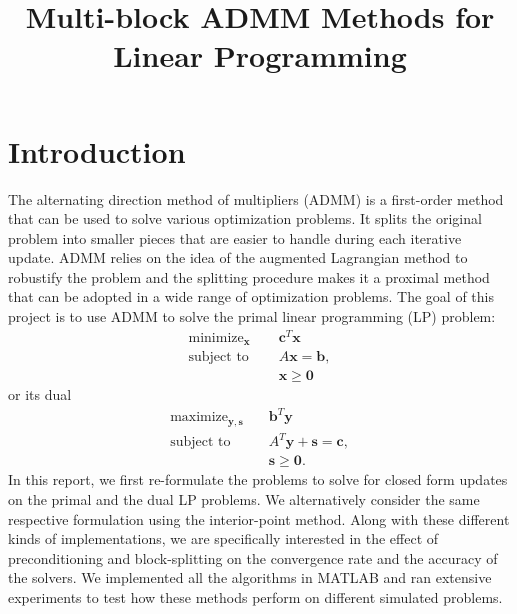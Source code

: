 \documentclass{article}
\title{Multi-block ADMM Methods for Linear Programming }
\author{\studentname}
\begin{document}
\maketitle
\vspace{0.1in}
\maketitle



\section{Introduction}
The alternating direction method of multipliers (ADMM) is a first-order method that can be used to solve various optimization problems. It splits the original problem into smaller pieces that are easier to handle during each iterative update. ADMM relies on the idea of the augmented Lagrangian method to robustify the problem and the splitting procedure makes it a proximal method that can be adopted in a wide range of optimization problems.
\newline
\newline
The goal of this project is to use ADMM to solve the primal linear programming  (LP) problem:
\begin{align}
\text{minimize}_{\mathbf{x}} &\quad \mathbf{c}^T\mathbf{x} \tag{OPT1}\label{OPT1} \\
\text{subject to } &\quad  A \mathbf{x} = \mathbf{b},  \nonumber \\
&\quad \mathbf{x} \geq \mathbf{0} \nonumber 
\end{align}
or its dual
\begin{align}
\text{maximize}_{\mathbf{y}, \mathbf{s}} &\quad \mathbf{b}^T\mathbf{y}  \tag{OPT2}\label{OPT2} \\
\text{subject to } &\quad  A^T \mathbf{y}  + \mathbf{s} = \mathbf{c},  \nonumber \\
&\quad \mathbf{s} \geq \mathbf{0} \nonumber.
\end{align}
In this report, we first re-formulate the problems to solve for closed form updates on the primal and the dual LP problems. We alternatively consider the same respective formulation using the interior-point method. Along with these different kinds of implementations, we are specifically interested in the effect of preconditioning and block-splitting on the convergence rate and the accuracy of the solvers. We implemented all the algorithms in MATLAB and ran extensive experiments to test how these methods perform on different simulated problems.
\end{document}
